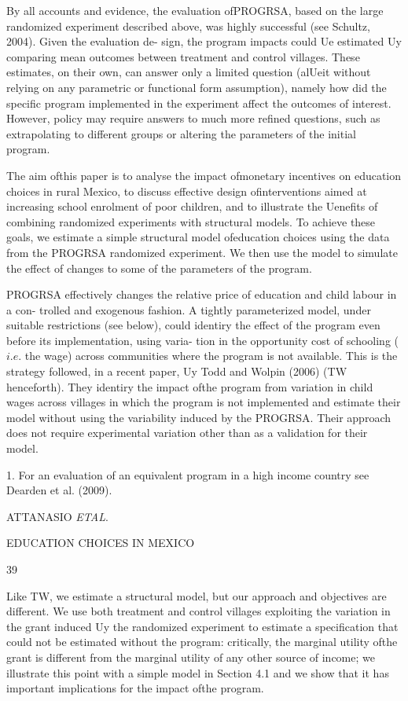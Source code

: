 By all accounts and evidence, the evaluation ofPROGRSA, based on the large randomized experiment described above, was highly successful (see Schultz, 2004). Given the evaluation de- sign, the program impacts could Ue estimated Uy comparing mean outcomes between treatment and control villages. These estimates, on their own, can answer only a limited question (alUeit without relying on any parametric or functional form assumption), namely how did the specific program implemented in the experiment affect the outcomes of interest. However, policy may require answers to much more refined questions, such as extrapolating to different groups or altering the parameters of the initial program.

The aim ofthis paper is to analyse the impact ofmonetary incentives on education choices in rural Mexico, to discuss effective design ofinterventions aimed at increasing school enrolment of poor children, and to illustrate the Uenefits of combining randomized experiments with structural models. To achieve these goals, we estimate a simple structural model ofeducation choices using the data from the PROGRSA randomized experiment. We then use the model to simulate the effect of changes to some of the parameters of the program.

PROGRSA effectively changes the relative price of education and child labour in a con- trolled and exogenous fashion. A tightly parameterized model, under suitable restrictions (see below), could identiry the effect of the program even before its implementation, using varia- tion in the opportunity cost of schooling ($i.e$. the wage) across communities where the program is not available. This is the strategy followed, in a recent paper, Uy Todd and Wolpin (2006) (TW henceforth). They identiry the impact ofthe program from variation in child wages across villages in which the program is not implemented and estimate their model without using the variability induced by the PROGRSA. Their approach does not require experimental variation other than as a validation for their model.

1. For an evaluation of an equivalent program in a high income country see Dearden et al. (2009).

ATTANASIO {\it ETAL}.

EDUCATION CHOICES IN MEXICO

39

Like TW, we estimate a structural model, but our approach and objectives are different. We use both treatment and control villages exploiting the variation in the grant induced Uy the randomized experiment to estimate a specification that could not be estimated without the program: critically, the marginal utility ofthe grant is different from the marginal utility of any other source of income; we illustrate this point with a simple model in Section 4.1 and we show that it has important implications for the impact ofthe program.

